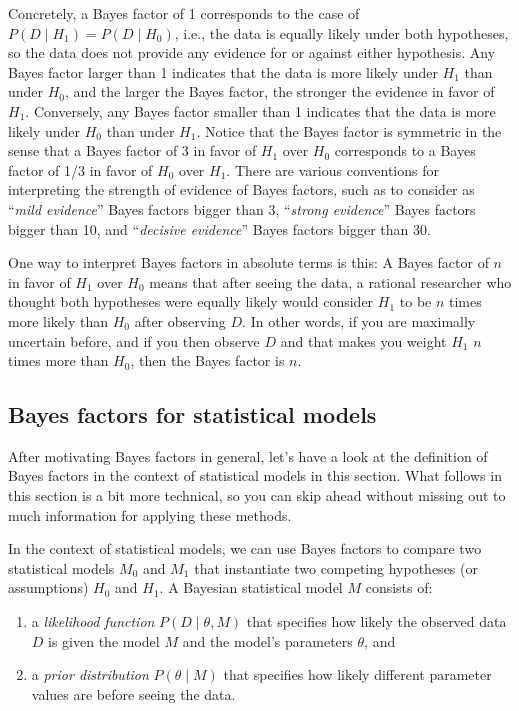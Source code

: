 \documentclass[
  doc,
  floatsintext,
  longtable,
  nolmodern,
  notxfonts,
  notimes,
  colorlinks=true,linkcolor=blue,citecolor=blue,urlcolor=blue]{apa7}
\providecommand{\tightlist}{%
  \setlength{\itemsep}{0pt}\setlength{\parskip}{0pt}}
\begin{document}
Concretely, a Bayes factor of 1 corresponds to the case of
\(P(D \mid H_1) = P(D \mid H_0)\), i.e., the data is equally likely
under both hypotheses, so the data does not provide any evidence for or
against either hypothesis. Any Bayes factor larger than 1 indicates that
the data is more likely under \(H_1\) than under \(H_0\), and the larger
the Bayes factor, the stronger the evidence in favor of \(H_1\).
Conversely, any Bayes factor smaller than 1 indicates that the data is
more likely under \(H_0\) than under \(H_1\). Notice that the Bayes
factor is symmetric in the sense that a Bayes factor of 3 in favor of
\(H_1\) over \(H_0\) corresponds to a Bayes factor of 1/3 in favor of
\(H_0\) over \(H_1\). There are various conventions for interpreting the
strength of evidence of Bayes factors, such as to consider as
``\emph{mild evidence}'' Bayes factors bigger than 3, ``\emph{strong
evidence}'' Bayes factors bigger than 10, and ``\emph{decisive
evidence}'' Bayes factors bigger than 30.

One way to interpret Bayes factors in absolute terms is this: A Bayes
factor of \(n\) in favor of \(H_1\) over \(H_0\) means that after seeing
the data, a rational researcher who thought both hypotheses were equally
likely would consider \(H_1\) to be \(n\) times more likely than \(H_0\)
after observing \(D\). In other words, if you are maximally uncertain
before, and if you then observe \(D\) and that makes you weight \(H_1\)
\(n\) times more than \(H_0\), then the Bayes factor is \(n\).

\subsection{Bayes factors for statistical
models}\label{bayes-factors-for-statistical-models}

After motivating Bayes factors in general, let's have a look at the
definition of Bayes factors in the context of statistical models in this
section. What follows in this section is a bit more technical, so you
can skip ahead without missing out to much information for applying
these methods.

In the context of statistical models, we can use Bayes factors to
compare two statistical models \(M_0\) and \(M_1\) that instantiate two
competing hypotheses (or assumptions) \(H_0\) and \(H_1\). A Bayesian
statistical model \(M\) consists of:

\begin{enumerate}
\def\labelenumi{\arabic{enumi}.}
\tightlist
\item
  a \emph{likelihood function} \(P(D \mid \theta, M)\) that specifies
  how likely the observed data \(D\) is given the model \(M\) and the
  model's parameters \(\theta\), and
\item
  a \emph{prior distribution} \(P(\theta \mid M)\) that specifies how
  likely different parameter values are before seeing the data.
\end{enumerate}
\end{document}
